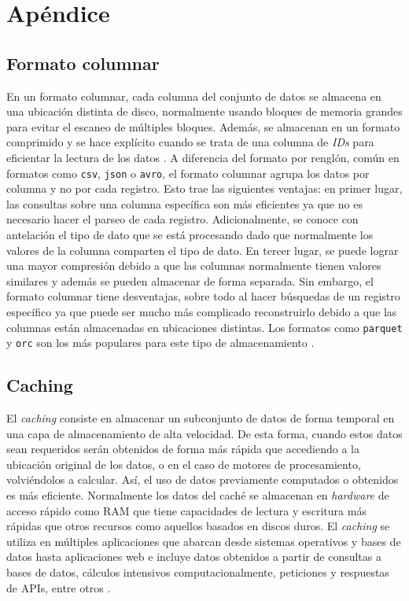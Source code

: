 \chapter{Apéndice}

\section{Formato columnar\label{formatocolumnar}}

\noindent En un formato columnar, cada columna del conjunto de datos se almacena en una ubicación distinta de disco, normalmente usando bloques de memoria grandes para evitar el escaneo de múltiples bloques. Además, se almacenan en un formato comprimido y se hace explícito cuando se trata de una columna de \textit{IDs} para eficientar la lectura de los datos \cite{column-oriented}. A diferencia del formato por renglón, común en formatos como \texttt{csv}, \texttt{json} o \texttt{avro}, el formato columnar agrupa los datos por columna y no por cada registro. Esto trae las siguientes ventajas: en primer lugar, las consultas sobre una columna específica son más eficientes ya que no es necesario hacer el parseo de cada registro. Adicionalmente, se conoce con antelación el tipo de dato que se está procesando dado que normalmente los valores de la columna comparten el tipo de dato. En tercer lugar, se puede lograr una mayor compresión debido a que las columnas normalmente tienen valores similares y además se pueden almacenar de forma separada. Sin embargo, el formato columnar tiene desventajas, sobre todo al hacer búsquedas de un registro específico ya que puede ser mucho más complicado reconstruirlo debido a que las columnas están almacenadas en ubicaciones distintas. Los formatos como \texttt{parquet} y \texttt{orc} son los más populares para este tipo de almacenamiento \cite{columnar-storage-blog}.

\section{Caching \label{caching}}

El \textit{caching} consiste en almacenar un subconjunto de datos de forma temporal en una capa de almacenamiento de alta velocidad. De esta forma, cuando estos datos sean requeridos serán obtenidos de forma más rápida que accediendo a la ubicación original de los datos, o en el caso de motores de procesamiento, volviéndolos a calcular. Así, el uso de datos previamente computados o obtenidos es más eficiente. Normalmente los datos del caché se almacenan en \textit{hardware} de acceso rápido como RAM que tiene capacidades de lectura y escritura más rápidas que otros recursos como aquellos basados en discos duros. El \textit{caching} se utiliza en múltiples aplicaciones que abarcan desde sistemas operativos y bases de datos hasta aplicaciones web e incluye datos obtenidos a partir de consultas a bases de datos, cálculos intensivos computacionalmente, peticiones y respuestas de APIs, entre otros \cite{aws-caching}. 
